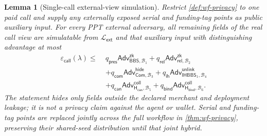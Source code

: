 \documentclass[letterpaper]{article}
\newcommand{\commit}{\mathsf{Com}}
\newcommand{\hash}{\mathsf{H}_{\mathsf{can}}}
\newcommand{\hashBind}{\mathsf{H}_{\mathsf{bind}}}
\newcommand{\bbs}{\mathsf{BBS}}
\newcommand{\Adv}{\mathsf{Adv}}
\newtheorem{lemma}{Lemma}
\begin{document}
\begin{lemma}[Single-call external-view simulation]
\label{thm:min-disclosure}
Restrict \cref{def:wf-privacy} to one paid call and supply any externally
exposed serial and funding-tag points as public auxiliary input. For every PPT
external adversary, all remaining fields of the real call view are simulatable
from \(\mathcal L_{\mathsf{ext}}\) and that auxiliary input with distinguishing
advantage at most
\begin{align}
\varepsilon_{\mathsf{call}}(\lambda)
\le\;&
q_{\mathsf{pres}}\Adv^{\mathsf{zk}}_{\bbs,\mathcal B_1}
+q_{\mathsf{rel}}\Adv^{\mathsf{zk}}_{\mathsf{rel},\mathcal B_2}
\nonumber\\
&+q_{\mathsf{com}}\Adv^{\mathsf{hide}}_{\commit,\mathcal B_3}
+q_{\mathsf{ih}}\Adv^{\mathsf{unlink}}_{\mathsf{IHBBS}_1,\mathcal B_4}
\nonumber\\
&+q_{\mathsf{can}}\Adv^{\mathsf{coll}}_{\hash,\mathcal B_5}
+q_{\mathsf{bind}}\Adv^{\mathsf{coll}}_{\hashBind,\mathcal B_6}.
\label{eq:min-disclosure-bound}
\end{align}
The statement hides only fields outside the declared merchant and deployment
leakage; it is not a privacy claim against the agent or wallet. Serial and
funding-tag points are replaced jointly across the full workflow in
\cref{thm:wf-privacy}, preserving their shared-seed distribution until that
joint hybrid.
\end{lemma}
\end{document}

